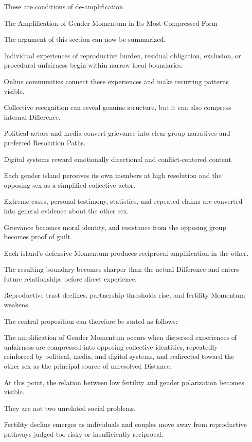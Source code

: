 These are conditions of de-amplification.

The Amplification of Gender Momentum in Its Most Compressed Form

The argument of this section can now be summarized.

Individual experiences of reproductive burden, residual obligation, exclusion, or procedural unfairness begin within narrow local boundaries.

Online communities connect these experiences and make recurring patterns visible.

Collective recognition can reveal genuine structure, but it can also compress internal Difference.

Political actors and media convert grievance into clear group narratives and preferred Resolution Paths.

Digital systems reward emotionally directional and conflict-centered content.

Each gender island perceives its own members at high resolution and the opposing sex as a simplified collective actor.

Extreme cases, personal testimony, statistics, and repeated claims are converted into general evidence about the other sex.

Grievance becomes moral identity, and resistance from the opposing group becomes proof of guilt.

Each island’s defensive Momentum produces reciprocal amplification in the other.

The resulting boundary becomes sharper than the actual Difference and enters future relationships before direct experience.

Reproductive trust declines, partnership thresholds rise, and fertility Momentum weakens.

The central proposition can therefore be stated as follows:

The amplification of Gender Momentum occurs when dispersed experiences of unfairness are compressed into opposing collective identities, repeatedly reinforced by political, media, and digital systems, and redirected toward the other sex as the principal source of unresolved Distance.

At this point, the relation between low fertility and gender polarization becomes visible.

They are not two unrelated social problems.

Fertility decline emerges as individuals and couples move away from reproductive pathways judged too risky or insufficiently reciprocal.

